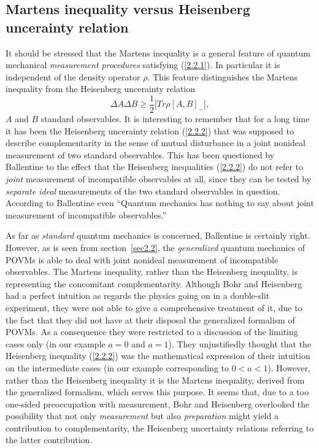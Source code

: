 \documentclass[12pt]{article}
\begin{document}
{\subsection{Martens inequality
versus Heisenberg uncerainty relation}\label{sec2.3} It should be
stressed that the Martens inequality is a general feature of
quantum mechanical \textit{measurement procedures} satisfying
(\ref{2.2.1}). In particular it is independent of the density
operator $\rho$. This feature distinguishes the Martens inequality
from the Heisenberg uncerainty relation
\begin{equation}\label{2.2.2}\Delta A \Delta B \geq \frac{1}{2} | Tr\rho
[A,B]_-|,\end{equation}
 $A$ and $B$ standard observables. It is
interesting to remember that for a long time it has been the
Heisenberg uncerainty relation (\ref{2.2.2}) that was supposed to
describe complementarity in the sense of mutual disturbance in a
joint nonideal measurement of two standard observables. This has
been questioned by Ballentine\cite{Bal70} to the effect that the
Heisenberg inequalities (\ref{2.2.2}) do not refer to
\textit{joint} measurement of incompatible observables at all,
since they can be tested by \textit{separate ideal} measurements
of the two standard observables in question. According to
Ballentine even ``Quantum mechanics has nothing to say about joint
measurement of incompatible observables.''

As far as \textit{standard} quantum mechanics is concerned,
Ballentine is certainly right. However, as is seen from
section~\ref{sec2.2}, the \textit{generalized} quantum mechanics
of POVMs is able to deal with joint nonideal measurement of
incompatible observables. The Martens inequality, rather than the
Heisenberg inequality, is representing the concomitant
complementarity. Although Bohr and Heisenberg had a perfect
intuition as regards the physics going on in a double-slit
experiment, they were not able to give a comprehensive treatment
of it, due to the fact that they did not have at their disposal
the generalized formalism of POVMs. As a consequence they were
restricted to a discussion of the limiting cases only (in our
example $a=0$ and $a=1$). They unjustifiedly thought\cite{dM2000}
that the Heisenberg inequality (\ref{2.2.2}) was the mathematical
expression of their intuition on the intermediate cases (in our
example corresponding to $0<a<1$). However, rather than the
Heisenberg inequality it is the Martens inequality, derived from
the generalized formalism, which serves this purpose. It seems
that, due to a too one-sided preoccupation with measurement, Bohr
and Heisenberg overlooked the possibility that not only
\textit{measurement} but also \textit{preparation} might yield a
contribution to complementarity, the Heisenberg uncertainty
relations referring to the latter contribution.

}
\end{document}
